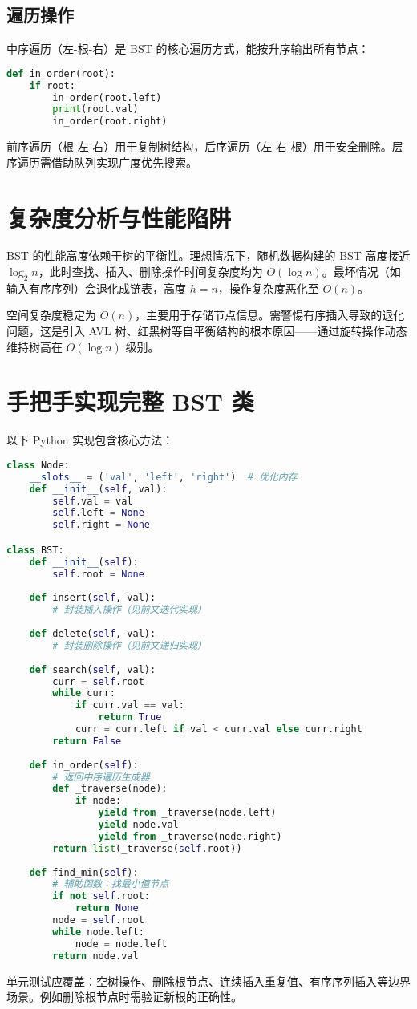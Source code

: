 \section{遍历操作}
中序遍历（左-根-右）是 BST 的核心遍历方式，能按升序输出所有节点：\par
\begin{lstlisting}[language=python]
def in_order(root):
    if root:
        in_order(root.left)
        print(root.val)
        in_order(root.right)
\end{lstlisting}
前序遍历（根-左-右）用于复制树结构，后序遍历（左-右-根）用于安全删除。层序遍历需借助队列实现广度优先搜索。\par
\chapter{复杂度分析与性能陷阱}
BST 的性能高度依赖于树的平衡性。理想情况下，随机数据构建的 BST 高度接近 $\log_2 n$，此时查找、插入、删除操作时间复杂度均为 $O(\log n)$。最坏情况（如输入有序序列）会退化成链表，高度 $h = n$，操作复杂度恶化至 $O(n)$。\par
空间复杂度稳定为 $O(n)$，主要用于存储节点信息。需警惕有序插入导致的退化问题，这是引入 AVL 树、红黑树等自平衡结构的根本原因——通过旋转操作动态维持树高在 $O(\log n)$ 级别。\par
\chapter{手把手实现完整 BST 类}
以下 Python 实现包含核心方法：\par
\begin{lstlisting}[language=python]
class Node:
    __slots__ = ('val', 'left', 'right')  # 优化内存
    def __init__(self, val):
        self.val = val
        self.left = None
        self.right = None

class BST:
    def __init__(self):
        self.root = None
    
    def insert(self, val):
        # 封装插入操作（见前文迭代实现）
    
    def delete(self, val):
        # 封装删除操作（见前文递归实现）
    
    def search(self, val):
        curr = self.root
        while curr:
            if curr.val == val:
                return True
            curr = curr.left if val < curr.val else curr.right
        return False
    
    def in_order(self):
        # 返回中序遍历生成器
        def _traverse(node):
            if node:
                yield from _traverse(node.left)
                yield node.val
                yield from _traverse(node.right)
        return list(_traverse(self.root))
    
    def find_min(self):
        # 辅助函数：找最小值节点
        if not self.root:
            return None
        node = self.root
        while node.left:
            node = node.left
        return node.val
\end{lstlisting}
单元测试应覆盖：空树操作、删除根节点、连续插入重复值、有序序列插入等边界场景。例如删除根节点时需验证新根的正确性。\par
